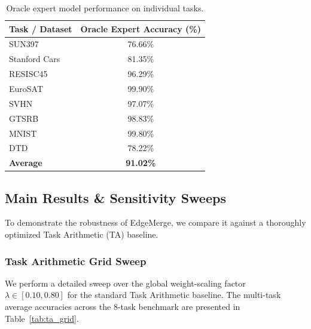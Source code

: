 \begin{table}[t]
\caption{Oracle expert model performance on individual tasks.}
\label{tab:oracle_experts}
\vskip 0.15in
\begin{center}
\begin{small}
\begin{sc}
\begin{tabular}{lc}
\toprule
Task / Dataset & Oracle Expert Accuracy (\%) \\
\midrule
SUN397        & 76.66\% \\
Stanford Cars & 81.35\% \\
RESISC45      & 96.29\% \\
EuroSAT       & 99.90\% \\
SVHN          & 97.07\% \\
GTSRB         & 98.83\% \\
MNIST         & 99.80\% \\
DTD           & 78.22\% \\
\midrule
\textbf{Average} & \textbf{91.02\%} \\
\bottomrule
\end{tabular}
\end{sc}
\end{small}
\end{center}
\vskip -0.1in
\end{table}

\subsection{Main Results \& Sensitivity Sweeps}

To demonstrate the robustness of EdgeMerge, we compare it against a thoroughly optimized Task Arithmetic (TA) baseline.

\subsubsection{Task Arithmetic Grid Sweep}
We perform a detailed sweep over the global weight-scaling factor $\lambda \in [0.10, 0.80]$ for the standard Task Arithmetic baseline. The multi-task average accuracies across the 8-task benchmark are presented in Table~\ref{tab:ta_grid}.


